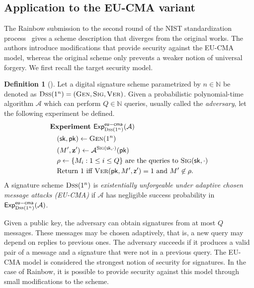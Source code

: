 \documentclass[12pt, a4paper, oneside]{memoir}
\theoremstyle{definition}
\newtheorem{definition}[theorem]{Definition}
\begin{document}
\subsection{Application to the EU-CMA variant}\label{subsec:efcma}

The Rainbow submission to the second round of the NIST standardization process~\cite{Ding:201901} gives a scheme description that diverges from the original works. The authors introduce modifications that provide security against the \textsf{EU-CMA} model, whereas the original scheme only prevents a weaker notion of universal forgery. We first recall the target security model.

\begin{definition}[{\cite[Def.~1.2]{Chen:201612}}]
  Let a digital signature scheme parametrized by $n \in \mathbb{N}$ be denoted as $\textsc{Dss}(1^{n}) = (\textsc{Gen}, \textsc{Sig}, \textsc{Ver})$. Given a probabilistic polynomial-time algorithm $\mathcal{A}$ which can perform $Q \in \mathbb{N}$ queries, usually called the \emph{adversary}, let the following experiment be defined.
  \begin{align}
    \begin{split}
      &\textbf{Experiment } \mathsf{Exp}_{\textsc{Dss}(1^{n})}^{\mathsf{eu-cma}}(\mathcal{A}) \\ 
      &\quad (\mathsf{sk}, \mathsf{pk}) \gets \textsc{Gen}(1^{n}) \\
      &\quad (M', \mathbf{z'}) \gets \mathcal{A}^{\textsc{Sig}(\mathsf{sk}, \cdot)}(\mathsf{pk}) \\
      &\quad \rho \gets \{ M_{i} : 1 \leq i \leq Q \} \text{ are the queries to } \textsc{Sig}(\mathsf{sk}, \cdot) \\
      &\quad \text{Return 1 iff } \textsc{Ver}(\mathsf{pk}, M', \mathsf{z'}) = 1 \text{ and } M' \not\in \rho.
    \end{split}
  \end{align}
  A signature scheme $\textsc{Dss}(1^{n})$ is \emph{existentially unforgeable under adaptive chosen message attacks (\textsf{EU-CMA})} if $\mathcal{A}$ has negligible success probability in $\mathsf{Exp}_{\textsc{Dss}(1^{n})}^{\mathsf{eu-cma}}(\mathcal{A})$.
\end{definition}

Given a public key, the adversary can obtain signatures from at most $Q$ messages. These messages may be chosen adaptively, that is, a new query may depend on replies to previous ones. The adversary succeeds if it produces a valid pair of a message and a signature that were not in a previous query. The \textsf{EU-CMA} model is considered the strongest notion of security for signatures. In the case of Rainbow, it is possible to provide security against this model through small modifications to the scheme.
\end{document}
